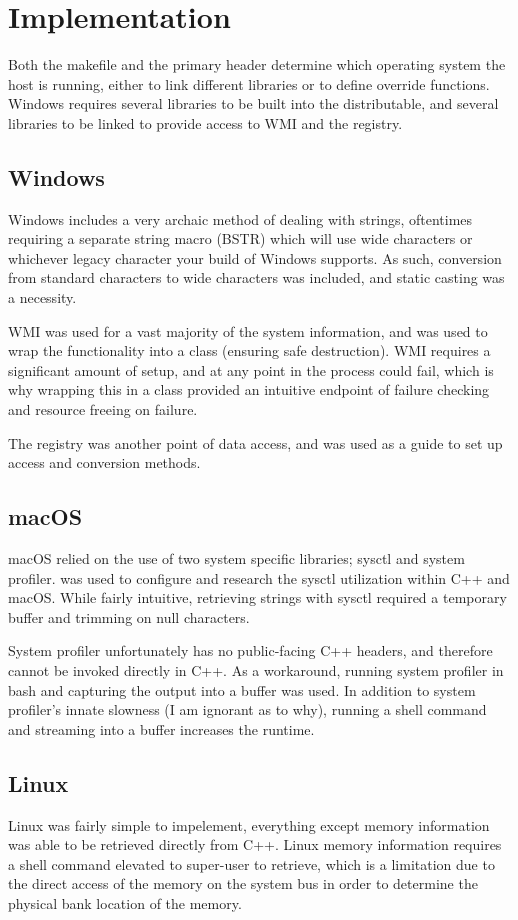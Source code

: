 \documentclass[conference]{IEEEtran}
\begin{document}
\section{Implementation}
Both the makefile and the primary header determine which operating system the host is running,
either to link different libraries or to define override functions.
Windows requires several libraries to be built into the distributable, and several libraries to
be linked to provide access to WMI and the registry.

\subsection{Windows}
Windows includes a very archaic method of dealing with strings, oftentimes requiring a separate string macro (BSTR)
which will use wide characters or whichever legacy character your build of Windows supports.
As such, conversion from standard characters to wide characters was included, and static casting was a necessity.

WMI was used for a vast majority of the system information,
and \cite{whims:wmi} was used to wrap the functionality into a class (ensuring safe destruction).
WMI requires a significant amount of setup, and at any point in the process could fail, which is why
wrapping this in a class provided an intuitive endpoint of failure checking and resource freeing on failure.

The registry was another point of data access, and \cite{dicanio:winreg} was used as a guide to set up
access and conversion methods.

\subsection{macOS}
macOS relied on the use of two system specific libraries; sysctl and system profiler.
\cite{aapl:sysctl} was used to configure and research the sysctl utilization within C++ and macOS.
While fairly intuitive, retrieving strings with sysctl required a temporary buffer and trimming on null characters.

System profiler unfortunately has no public-facing C++ headers, and therefore cannot be invoked directly in C++.
As a workaround, running system profiler in bash and capturing the output into a buffer was used.
In addition to system profiler's innate slowness (I am ignorant as to why),
running a shell command and streaming into a buffer increases the runtime.

\subsection{Linux}
Linux was fairly simple to impelement, everything except memory information was able to be retrieved directly from C++.
Linux memory information requires a shell command elevated to super-user to retrieve, which is a limitation due to the
direct access of the memory on the system bus in order to determine the physical bank location of the memory.
\end{document}
